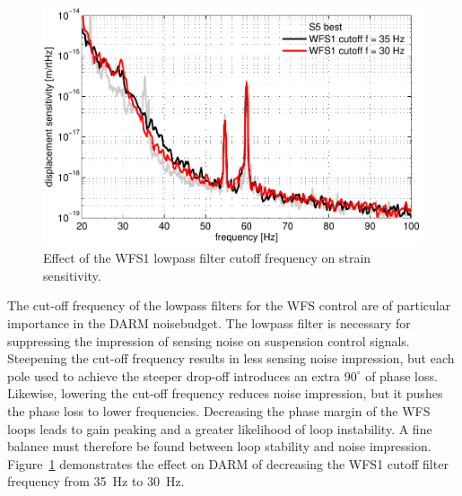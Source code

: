 \begin{figure}
\begin{centering}
\includegraphics[width=1.0\textwidth]{figures/cutoffWFS1_DARMcompare.pdf}
\caption[Effect of the WFS1 lowpass filter cutoff frequency on strain
sensitivity.]{Effect of the WFS1 lowpass filter cutoff frequency on
  strain sensitivity.}
\label{fig:WFS1cutoff}
\end{centering}
\end{figure}

The cut-off frequency of the lowpass filters for the WFS control are
of particular importance in the DARM noisebudget. The lowpass filter
is necessary for suppressing the impression of sensing noise on
suspension control signals. Steepening the cut-off frequency results
in less sensing noise impression, but each pole used to achieve the
steeper drop-off introduces an extra $90^{\circ}$ of phase
loss. Likewise, lowering the cut-off frequency reduces noise
impression, but it pushes the phase loss to lower
frequencies. Decreasing the phase margin of the WFS loops leads to
gain peaking and a greater likelihood of loop instability. A fine
balance must therefore be found between loop stability and noise
impression. Figure~\ref{fig:WFS1cutoff} demonstrates the effect on
DARM of decreasing the WFS1 cutoff filter frequency from 35~Hz to
30~Hz.







